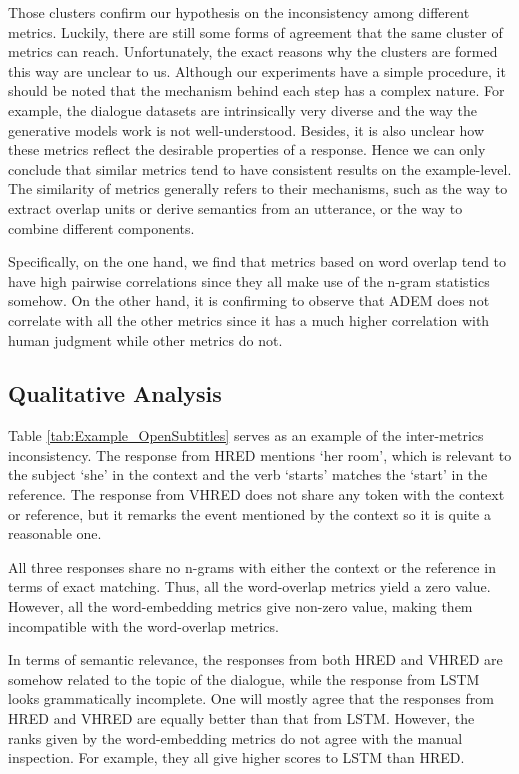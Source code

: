 \documentclass[runningheads]{llncs}
\begin{document}
    Those clusters confirm our hypothesis on the inconsistency among different metrics. Luckily, there are still some forms of agreement that the same cluster of metrics can reach. Unfortunately, the exact reasons why the clusters are formed this way are unclear to us. Although our experiments have a simple procedure, it should be noted that the mechanism behind each step has a complex nature. For example, the dialogue datasets are intrinsically very diverse and the way the generative models work is not well-understood. Besides, it is also unclear how these metrics reflect the desirable properties of a response. Hence we can only conclude that similar metrics tend to have consistent results on the example-level. The similarity of metrics generally refers to their mechanisms, such as the way to extract overlap units or derive semantics from an utterance, or the way to combine different components.

    Specifically, on the one hand, we find that metrics based on word overlap tend to have high pairwise correlations since they all make use of the n-gram statistics somehow. On the other hand, it is confirming to observe that ADEM does not correlate with all the other metrics since it has a much higher correlation with human judgment while other metrics do not.

    \subsection{Qualitative Analysis}
    
    Table \ref{tab:Example_OpenSubtitles} serves as an example of the inter-metrics inconsistency. The response from HRED mentions `her room', which is relevant to the subject `she' in the context and the verb `starts' matches the `start' in the reference. The response from VHRED does not share any token with the context or reference, but it remarks the event mentioned by the context so it is quite a reasonable one.

    All three responses share no n-grams with either the context or the reference in terms of exact matching. Thus, all the word-overlap metrics yield a zero value. However, all the word-embedding metrics give non-zero value, making them incompatible with the word-overlap metrics.

    In terms of semantic relevance, the responses from both HRED and VHRED are somehow related to the topic of the dialogue, while the response from LSTM looks grammatically incomplete. One will mostly agree that the responses from HRED and VHRED are equally better than that from LSTM. However, the ranks given by the word-embedding metrics do not agree with the manual inspection. For example, they all give higher scores to LSTM than HRED.
\end{document}
